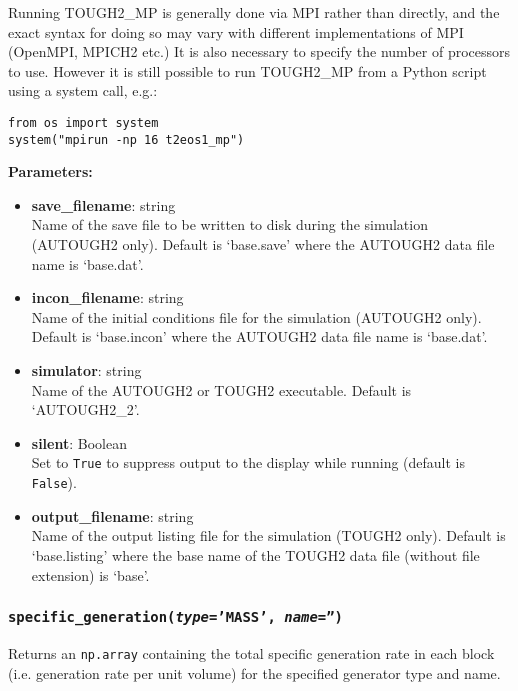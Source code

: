 Running TOUGH2\_MP is generally done via MPI rather than directly, and the exact syntax for doing so may vary with different implementations of MPI (OpenMPI, MPICH2 etc.)  It is also necessary to specify the number of processors to use.  However it is still possible to run TOUGH2\_MP from a Python script using a system call, e.g.:

\begin{lstlisting}
from os import system
system("mpirun -np 16 t2eos1_mp")
\end{lstlisting}

\textbf{Parameters:}
\begin{itemize}
\item \textbf{save\_filename}: string\\
  Name of the save file to be written to disk during the simulation (AUTOUGH2 only).  Default is `base.save' where the AUTOUGH2 data file name is `base.dat'.
\item \textbf{incon\_filename}: string\\
  Name of the initial conditions file for the simulation (AUTOUGH2 only).  Default is `base.incon' where the AUTOUGH2 data file name is `base.dat'.
\item \textbf{simulator}: string\\
  Name of the AUTOUGH2 or TOUGH2 executable.  Default is `AUTOUGH2\_2'.
\item \textbf{silent}: Boolean\\
  Set to \texttt{True} to suppress output to the display while running (default is \texttt{False}).
\item \textbf{output\_filename}: string\\
  Name of the output listing file for the simulation (TOUGH2 only).  Default is `base.listing' where the base name of the TOUGH2 data file (without file extension) is `base'.
\end{itemize}

\begin{snugshade}
\subsubsection{\texttt{specific\_generation(\emph{type}='MASS', \emph{name}='')}}
\end{snugshade}
\label{sec:t2data:specific_generation}

Returns an \texttt{np.array} containing the total specific generation rate in each block (i.e. generation rate per unit volume) for the specified generator type and name.

